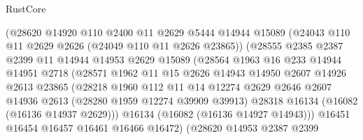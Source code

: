 \begin{lexlean}{RustCore}
\begin{coremodule}
                          (@28620
                            @14920
                            @110
                            @2400
                            @11
                            @2629
                            @5444
                            @14944
                            @15089
                            (@24043 @110 @11 @2629 @2626 (@24049 @110 @11 @2626 @23865))
                            (@28555
                              @2385
                              @2387
                              @2399
                              @11
                              @14944
                              @14953
                              @2629
                              @15089
                              (@28564
                                @1963
                                @16
                                @233
                                @14944
                                @14951
                                @2718
                                (@28571
                                  @1962
                                  @11
                                  @15
                                  @2626
                                  @14943
                                  @14950
                                  @2607
                                  @14926
                                  @2613
                                  @23865
                                  (@28218
                                    @1960
                                    @112
                                    @11
                                    @14
                                    @12274
                                    @2629
                                    @2646
                                    @2607
                                    @14936
                                    @2613
                                    (@28280 @1959 @12274 @39909 @39913)
                                    @28318
                                    @16134
                                    (@16082 (@16136 @14937 @2629)))
                                  @16134
                                  (@16082 (@16136 @14927 @14943)))
                                @16451
                                @16454
                                @16457
                                @16461
                                @16466
                                @16472)
                              (@28620
                                @14953
                                @2387
                                @2399

\end{coremodule}
\end{lexlean}
